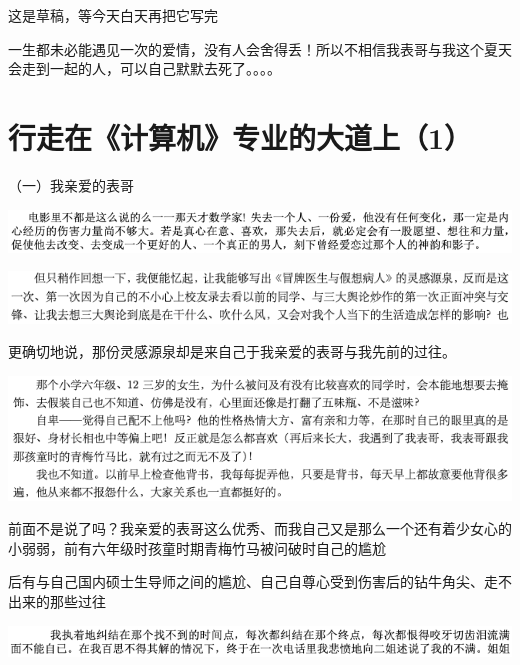 \documentclass[9pt, b5paper]{article}
\begin{document}
这是草稿，等今天白天再把它写完

一生都未必能遇见一次的爱情，没有人会舍得丢！所以不相信我表哥与我这个夏天会走到一起的人，可以自己默默去死了。。。。


\section{行走在《计算机》专业的大道上（1）}
\label{sec:orgac899fa}

（一）我亲爱的表哥

\begin{center}
\includegraphics[width=.9\linewidth]{./pic/backups_plans_20210420_115239.png}
\end{center}

\begin{center}
\includegraphics[width=.9\linewidth]{./pic/backups_plans_20210424_085313.png}
\end{center}

更确切地说，那份灵感源泉却是来自己于我亲爱的表哥与我先前的过往。 

\begin{center}
\includegraphics[width=.9\linewidth]{./pic/backups_plans_20210424_112502.png}
\end{center}

前面不是说了吗？我亲爱的表哥这么优秀、而我自己又是那么一个还有着少女心的小弱弱，前有六年级时孩童时期青梅竹马被问破时自己的尴尬

后有与自己国内硕士生导师之间的尴尬、自己自尊心受到伤害后的钻牛角尖、走不出来的那些过往

\begin{center}
\includegraphics[width=.9\linewidth]{./pic/backups_plans_20210424_085829.png}
\end{center}
\end{document}
